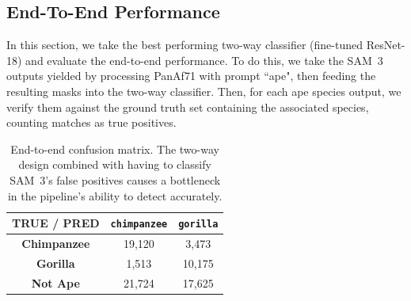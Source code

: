 \documentclass[author={Jacob Stephenson},
    degree={BSc},
    title={Robust Great Ape Species Detection in Wild Camera Trap Imagery with Promptable Concept Segmentation},
    unit={COMS30045},
    subtitle={}]{dissertation}
\begin{document}
\subsection{End-To-End Performance}

In this section, we take the best performing two-way classifier (fine-tuned ResNet-18) and evaluate the end-to-end performance. To do this, we take the SAM~3 outputs yielded by processing PanAf71 with prompt ``ape", then feeding the resulting masks into the two-way classifier. Then, for each ape species output, we verify them against the ground truth set containing the associated species, counting matches as true positives.




\begin{table}[H]
    \centering

    \begin{tabular}{c|cc}
        \textbf{TRUE / PRED} & \texttt{chimpanzee} & \texttt{gorilla} \\
        \midrule
        \textbf{Chimpanzee} & 19,120 & 3,473 \\
        \textbf{Gorilla} & 1,513 & 10,175 \\
        \textbf{Not Ape} & 21,724 & 17,625 \\
        \bottomrule
    \end{tabular}

    \caption[End-to-End Confusion Matrix]{End-to-end confusion matrix. The two-way design combined with having to classify SAM~3's false positives causes a bottleneck in the pipeline's ability to detect accurately.}
    \label{tab:etecmatrix}
\end{table}
\end{document}
